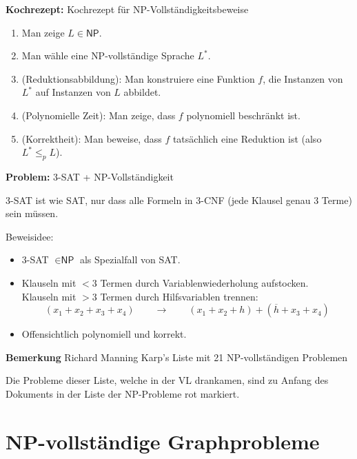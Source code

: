\documentclass[a4paper,graphics,11pt]{article}
\begin{document}
\newpage

\textbf{Kochrezept:} Kochrezept für \textsf{NP}-Vollständigkeitsbeweise

\begin{enumerate}
    \item Man zeige $L \in \textsf{NP}$.
    \item Man wähle eine \textsf{NP}-vollständige Sprache $L^*$.
    \item (Reduktionsabbildung): Man konstruiere eine Funktion $f$, die Instanzen von $L^*$ auf
        Instanzen von $L$ abbildet.
    \item (Polynomielle Zeit): Man zeige, dass $f$ polynomiell beschränkt ist.
    \item (Korrektheit): Man beweise, dass $f$ tatsächlich eine Reduktion ist
        (also $L^* \leq_p L$).
\end{enumerate}

\strut

\textbf{Problem:} 3-SAT + \textsf{NP}-Vollständigkeit

3-SAT ist wie SAT, nur dass alle Formeln in 3-CNF (jede Klausel genau 3 Terme) sein müssen.

Beweisidee:
\begin{itemize}
    \item 3-SAT $\in \textsf{NP}$ als Spezialfall von SAT.
    \item Klauseln mit $< 3$ Termen durch Variablenwiederholung aufstocken.\\
        Klauseln mit $> 3$ Termen durch Hilfsvariablen trennen:
        $$
            (x_1 + x_2 + x_3 + x_4)
            \qquad\rightarrow\qquad
            (x_1 + x_2 + h) + (\overline{h} + x_3 + x_4)
        $$
    \item Offensichtlich polynomiell und korrekt.
\end{itemize}

\strut

\textbf{Bemerkung} Richard Manning Karp's Liste mit 21 \textsf{NP}-vollständigen Problemen

Die Probleme dieser Liste, welche in der VL drankamen, sind zu Anfang des Dokuments
in der Liste der \textsf{NP}-Probleme {\color{red} rot markiert}.

\newpage

\section{\textsf{NP}-vollständige Graphprobleme}
\end{document}

